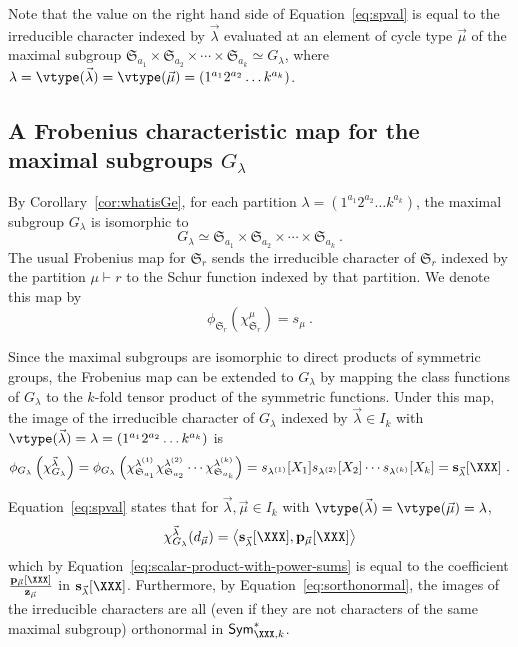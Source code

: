 Note that the value on the right hand side of Equation~\eqref{eq:spval}
is equal to the irreducible character indexed by $\vec{\lambda}$
evaluated at an element of cycle type $\vec{\mu}$ of the maximal subgroup
$\mathfrak{S}_{a_1} \times \mathfrak{S}_{a_2} \times \cdots \times \mathfrak{S}_{a_k} \simeq
G_\lambda$, where $\lambda = \vtype(\vec{\lambda}) = \vtype(\vec{\mu})=(1^{a_1} 2^{a_2} \ldots k^{a_k})$.

\subsection{A Frobenius characteristic map for the maximal subgroups $G_\lambda$}
By Corollary~\ref{cor:whatisGe},
for each partition $\lambda = (1^{a_1}2^{a_2}\ldots k^{a_k})$,
the maximal subgroup $G_\lambda$ is isomorphic to
\[
    G_\lambda \simeq
    \mathfrak{S}_{a_1} \times \mathfrak{S}_{a_2} \times \cdots \times \mathfrak{S}_{a_k}~.
\]
The usual Frobenius map for $\mathfrak{S}_r$ sends the irreducible character of $\mathfrak{S}_r$
indexed by the partition $\mu \vdash r$ to the Schur function indexed
by that partition.  We denote this map by
\[
    \phi_{\mathfrak{S}_r}( \chi^\mu_{\mathfrak{S}_r} ) = s_\mu~.
\]

Since the maximal subgroups are isomorphic to direct products of
symmetric groups, the Frobenius map can be extended to $G_\lambda$ by
mapping the class functions of $G_\lambda$
to the $k$-fold tensor product of the symmetric functions.
Under this map, the image of the irreducible character of $G_\lambda$ indexed by $\vec{\lambda} \in I_k$
with $\vtype(\vec{\lambda}) = \lambda = (1^{a_1}2^{a_2}\ldots k^{a_k})$
is
\[
    \phi_{G_\lambda}\left( \chi^{\vec{\lambda}}_{G_\lambda}\right) =
    \phi_{G_\lambda}\left( \chi^{\lambda^{(1)}}_{\mathfrak{S}_{a_1}}
    \chi^{\lambda^{(2)}}_{\mathfrak{S}_{a_2}}
    \cdots
    \chi^{\lambda^{(k)}}_{\mathfrak{S}_{a_k}} \right)
    = s_{\lambda^{(1)}}[X_1] s_{\lambda^{(2)}}[X_2] \cdots s_{\lambda^{(k)}}[X_k]
    = \mathbf{s}_{\vec{\lambda}}[\XXX]~.
\]

Equation~\eqref{eq:spval} states that for $\vec{\lambda}, \vec{\mu} \in I_k$
with $\vtype(\vec{\lambda}) = \vtype(\vec{\mu}) = \lambda$,
\[
    \chi^{\vec{\lambda}}_{G_\lambda}( d_{\vec{\mu}})
    = \left< \mathbf{s}_{\vec{\lambda}}[\XXX], \mathbf{p}_{\vec{\mu}}[\XXX]\right>
\]
which by Equation~\eqref{eq:scalar-product-with-power-sums} is equal to the coefficient
$\frac{\mathbf{p}_{\vec{\mu}}[\XXX]}{\mathbf{z}_{\vec{\mu}}}$
in $\mathbf{s}_{\vec{\lambda}}[\XXX]$.
Furthermore, by Equation~\eqref{eq:sorthonormal}, the images
of the irreducible characters are all (even if they are not
characters of the same maximal subgroup)
orthonormal in $\mathsf{Sym}^{\ast}_{\XXX,k}$.


